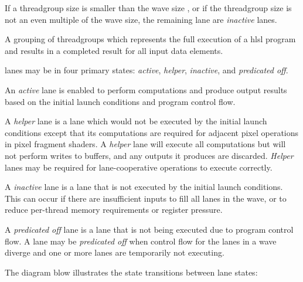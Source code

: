 \p If a \gls{threadgroup} size is smaller than the \gls{wave} size , or if the
\gls{threadgroup} size is not an even multiple of the \gls{wave} size, the
remaining \gls{lane} are \textit{inactive} \gls{lane}s.


\p A grouping of \gls{threadgroup}s which represents the full execution of a
\acrshort{hlsl} program and results in a completed result for all input data
elements.


\p \gls{lane}s may be in four primary states: \textit{active}, \textit{helper},
\textit{inactive}, and \textit{predicated off}.

\p An \textit{active} \gls{lane} is enabled to perform computations and produce
output results based on the initial launch conditions and program control flow.

\p A \textit{helper} \gls{lane} is a lane which would not be executed by the
initial launch conditions except that its computations are required for adjacent
pixel operations in pixel fragment shaders. A \textit{helper} \gls{lane} will
execute all computations but will not perform writes to buffers, and any outputs
it produces are discarded. \textit{Helper} lanes may be required for
\gls{lane}-cooperative operations to execute correctly.

\p A \textit{inactive} \gls{lane} is a lane that is not executed by the initial
launch conditions. This can occur if there are insufficient inputs to fill all
\gls{lane}s in the \gls{wave}, or to reduce per-thread memory requirements or
register pressure.

\p A \textit{predicated off} \gls{lane} is a lane that is not being executed due
to program control flow. A \gls{lane} may be \textit{predicated off} when
control flow for the \gls{lane}s in a \gls{wave} diverge and one or more lanes
are temporarily not executing.

\p The diagram blow illustrates the state transitions between \gls{lane} states:


